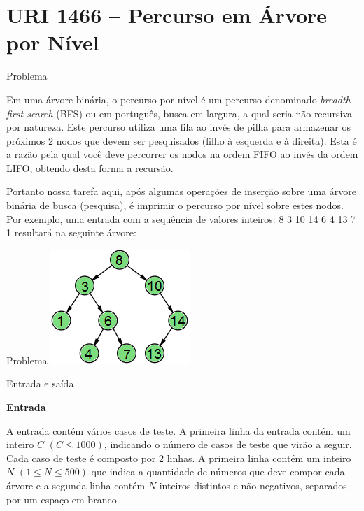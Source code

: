 \section{URI 1466 -- Percurso em Árvore por Nível}

\begin{frame}[fragile]{Problema}

Em uma árvore binária, o percurso por nível é um percurso denominado \textit{breadth first search} (BFS) ou em português, busca em largura, a qual seria não-recursiva por natureza. Este percurso utiliza uma fila ao invés de pilha para armazenar os próximos 2 nodos que devem ser pesquisados (filho à esquerda e à direita). Esta é a razão pela qual você deve percorrer os nodos na ordem FIFO ao invés da ordem LIFO, obtendo desta forma a recursão.

Portanto nossa tarefa aqui, após algumas operações de inserção sobre uma árvore binária de busca (pesquisa), é imprimir o percurso por nível sobre estes nodos. Por exemplo, uma entrada com a sequência de valores inteiros: 8 3 10 14 6 4 13 7 1 resultará na seguinte árvore:

\end{frame}


\begin{frame}[fragile]{Problema}
    \includegraphics[scale=1,center]{figures/UOJ_1466.png}
\end{frame}

\begin{frame}[fragile]{Entrada e saída}

\textbf{Entrada}

A entrada contém vários casos de teste. A primeira linha da entrada contém um inteiro $C$ $(C \leq 1000)$, indicando o número de casos de teste que virão a seguir. Cada caso de teste é composto por 2 linhas. A primeira linha contém um inteiro $N$ $(1 \leq N \leq 500)$ que indica a quantidade de números que deve compor cada árvore e a segunda linha contém $N$ inteiros distintos e não negativos, separados por um espaço em branco.

\end{frame}

